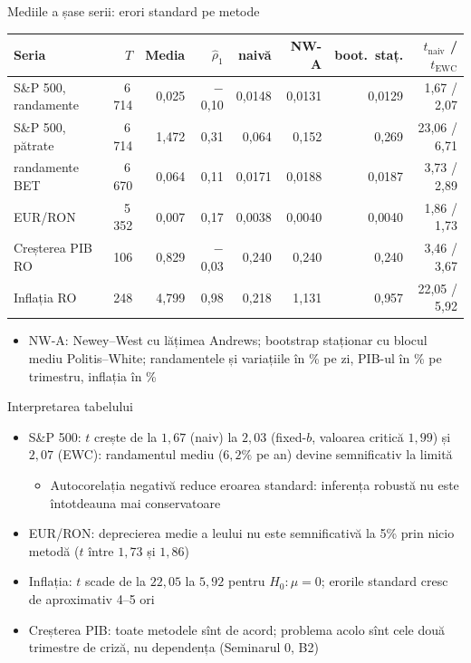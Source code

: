 \begin{frame}{Mediile a șase serii: erori standard pe metode}
\itemsize{\footnotesize}
\begin{center}
\footnotesize
\begin{tabular}{lrrrrrrr}
\toprule
Seria & $T$ & Media & $\hat\rho_1$ & naivă & NW-A & boot.\ staț. & $t_{\text{naiv}}$ / $t_{\text{EWC}}$ \\
\midrule
S\&P 500, randamente & 6\,714 & 0{,}025 & \ensuremath{-}0{,}10 & 0{,}0148 & 0{,}0131 & 0{,}0129 & 1{,}67 / 2{,}07 \\
S\&P 500, pătrate & 6\,714 & 1{,}472 & 0{,}31 & 0{,}064 & 0{,}152 & 0{,}269 & 23{,}06 / 6{,}71 \\
randamente BET & 6\,670 & 0{,}064 & 0{,}11 & 0{,}0171 & 0{,}0188 & 0{,}0187 & 3{,}73 / 2{,}89 \\
EUR/RON & 5\,352 & 0{,}007 & 0{,}17 & 0{,}0038 & 0{,}0040 & 0{,}0040 & 1{,}86 / 1{,}73 \\
Creșterea PIB RO & 106 & 0{,}829 & \ensuremath{-}0{,}03 & 0{,}240 & 0{,}240 & 0{,}240 & 3{,}46 / 3{,}67 \\
Inflația RO & 248 & 4{,}799 & 0{,}98 & 0{,}218 & 1{,}131 & 0{,}957 & 22{,}05 / 5{,}92 \\
\bottomrule
\end{tabular}
\end{center}
\begin{itemize}
    \item NW-A: Newey--West cu lățimea Andrews; bootstrap staționar cu blocul mediu Politis--White; randamentele și variațiile în \% pe zi, PIB-ul în \% pe trimestru, inflația în \%
\end{itemize}
\end{frame}

\begin{frame}{Interpretarea tabelului}
\itemsize{\footnotesize}
\begin{itemize}
    \item S\&P 500: $t$ crește de la $1{,}67$ (naiv) la $2{,}03$ (fixed-$b$, valoarea critică $1{,}99$) și $2{,}07$ (EWC): randamentul mediu ($6{,}2\%$ pe an) devine semnificativ la limită
    \begin{itemize}
        \item Autocorelația negativă reduce eroarea standard: inferența robustă nu este întotdeauna mai conservatoare
    \end{itemize}
    \item EUR/RON: deprecierea medie a leului nu este semnificativă la 5\% prin nicio metodă ($t$ între $1{,}73$ și $1{,}86$)
    \item Inflația: $t$ scade de la $22{,}05$ la $5{,}92$ pentru $H_0: \mu = 0$; erorile standard cresc de aproximativ 4--5 ori
    \item Creșterea PIB: toate metodele sînt de acord; problema acolo sînt cele două trimestre de criză, nu dependența (Seminarul 0, B2)
\end{itemize}
\end{frame}

